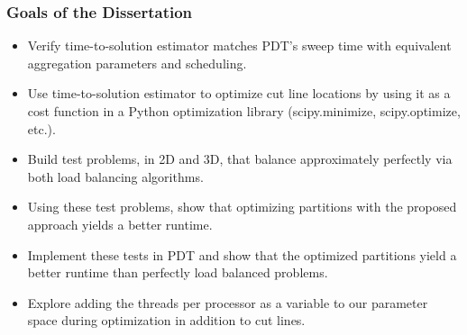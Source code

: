 \documentclass[xcolor={usenames,dvipsnames,svgnames,table}]{beamer}
\begin{document}
\begin{frame}[t]\frametitle{Goals of the Dissertation}
\begin{block}{}
\begin{itemize}
	\item Verify time-to-solution estimator matches PDT's sweep time with equivalent aggregation parameters and scheduling.
	\item Use time-to-solution estimator to optimize cut line locations by using it as a cost function in a Python optimization library (scipy.minimize, scipy.optimize, etc.). 
	\item Build test problems, in 2D and 3D, that balance approximately perfectly via both load balancing algorithms.
	\item Using these test problems, show that optimizing partitions with the proposed approach yields a better runtime.
	\item Implement these tests in PDT and show that the optimized partitions yield a better runtime than perfectly load balanced problems.
	\item Explore adding the threads per processor as a variable to our parameter space during optimization in addition to cut lines.
\end{itemize}
\end{block}
\end{frame}
\end{document}
